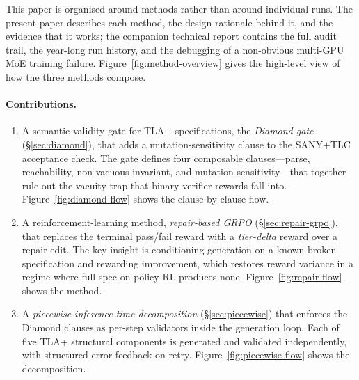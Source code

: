 \documentclass[11pt]{article}
\begin{document}
This paper is organised around methods rather than around individual
runs.  The present paper describes each method, the design rationale
behind it, and the evidence that it works; the companion technical
report contains the full audit trail, the year-long run history, and
the debugging of a non-obvious multi-GPU MoE training failure.
Figure~\ref{fig:method-overview} gives the high-level view of how
the three methods compose.

\paragraph{Contributions.}
\begin{enumerate}[leftmargin=1.4em, itemsep=3pt]
\item A semantic-validity gate for TLA+ specifications, the
  \emph{Diamond gate} (\S\ref{sec:diamond}), that adds a
  mutation-sensitivity clause to the SANY$+$TLC acceptance check.
  The gate defines four composable clauses---parse, reachability,
  non-vacuous invariant, and mutation sensitivity---that together
  rule out the vacuity trap that binary verifier rewards fall into.
  Figure~\ref{fig:diamond-flow} shows the clause-by-clause flow.
\item A reinforcement-learning method, \emph{repair-based GRPO}
  (\S\ref{sec:repair-grpo}), that replaces the terminal pass/fail
  reward with a \emph{tier-delta} reward over a repair edit.
  The key insight is conditioning generation on a known-broken
  specification and rewarding improvement, which restores reward
  variance in a regime where full-spec on-policy RL produces none.
  Figure~\ref{fig:repair-flow} shows the method.
\item A \emph{piecewise inference-time decomposition}
  (\S\ref{sec:piecewise}) that enforces the Diamond clauses as
  per-step validators inside the generation loop. Each of five
  TLA+ structural components is generated and validated
  independently, with structured error feedback on retry.
  Figure~\ref{fig:piecewise-flow} shows the decomposition.
\end{enumerate}
\end{document}
